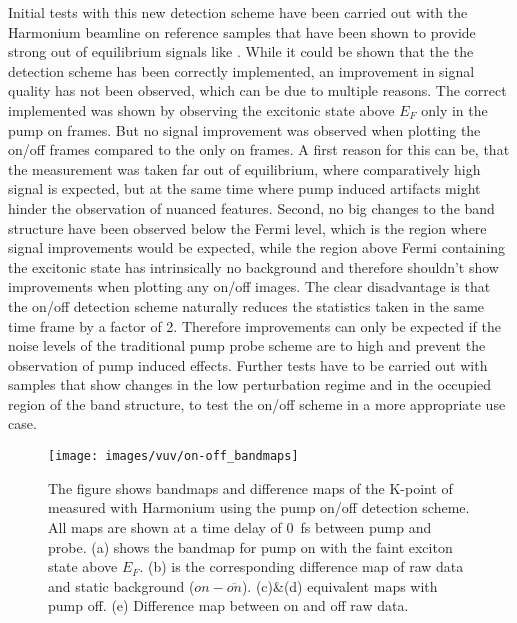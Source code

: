 Initial tests with this new detection scheme have been carried out with the Harmonium beamline on reference samples that have been shown to provide strong out of equilibrium signals like  \cite{puppin_excited-state_2022}.
While it could be shown that the the detection scheme has been correctly implemented, an improvement in signal quality has not been observed, which can be due to multiple reasons.
The correct implemented was shown by observing the excitonic state above $E_F$ only in the pump on frames.
But no signal improvement was observed when plotting the on/off frames compared to the only on frames.
A first reason for this can be, that the measurement was taken far out of equilibrium, where comparatively high signal is expected, but at the same time where pump induced artifacts might hinder the observation of nuanced features.
Second, no big changes to the band structure have been observed below the Fermi level, which is the region where signal improvements would be expected, while the region above Fermi containing the excitonic state has intrinsically no background and therefore shouldn't show improvements when plotting any on/off images.
The clear disadvantage is that the on/off detection scheme naturally reduces the statistics taken in the same time frame by a factor of 2.
Therefore improvements can only be expected if the noise levels of the traditional pump probe scheme are to high and prevent the observation of pump induced effects.
Further tests have to be carried out with samples that show changes in the low perturbation regime and in the occupied region of the band structure, to test the on/off scheme in a more appropriate use case.

\begin{figure}
	\centering
	\texttt{[image: images/vuv/on-off\_bandmaps]}
	\caption{The figure shows bandmaps and difference maps of the K-point of  measured with Harmonium using the pump on/off detection scheme. All maps are shown at a time delay of \qty{0}{\femto\second} between pump and probe.
	(a) shows the bandmap for pump on with the faint exciton state above $E_F$. (b) is the corresponding difference map of raw data and static background ($on-\overline{on}$). (c)\&(d) equivalent maps with pump off. (e) Difference map between on and off raw data.}
	\label{fig:on-offbandmaps}
\end{figure}
